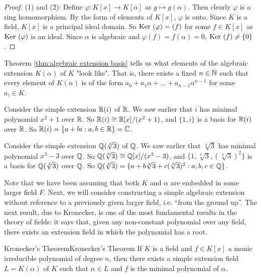 \begin{proof}
    (1) and (2): 
    Define $\varphi: K[x]\rightarrow K[\alpha]$ as $g\mapsto g(\alpha)$. 
    Then clearly $\varphi$ is a ring homomorphism. By the form of elements of $K[x]$, $\varphi$ is onto. 
    Since $K$ is a field, $K[x]$ is a principal ideal domain.
    So $\text{Ker }(\varphi)=(f)$ for some $f\in K[x]$ as $\text{Ker }(\varphi)$ is an ideal. 
    Since $\alpha$ is algebraic and $\varphi(f)=f(\alpha)=0$, $\text{Ker }(f)\neq \{0\}$.
\end{proof}



\begin{remark}
    Theorem \ref{thm:algebraic extension basis} tells us what elements of the algebraic extension $K(\alpha)$ of $K$
"look like". That is, there exists a fixed $n\in\mathbb{N}$ such that every element of $K(\alpha)$ is of the form $a_0+a_1\alpha+...+a_{n-1}\alpha^{n-1}$
for some $a_i\in K$.
\end{remark}

\begin{example}{}{}
    Consider the simple extension $\mathbb{R}(i)$ of $\mathbb{R}$. We saw earlier that $i$ has minimal polynomial $x^2+1$
    over $\mathbb{R}$. So $\mathbb{R}(i)\cong \mathbb{R}[x]/(x^2+1)$, and $\{1,i\}$ is a basis for $\mathbb{R}(i)$ over $\mathbb{R}$.
    So $\mathbb{R}(i)=\{a+bi:a,b\in\mathbb{R}\}=\mathbb{C}$.
\end{example}

\begin{example}{}{}
    Consider the simple extension $\mathbb{Q}(\sqrt[3]{3})$ of $\mathbb{Q}$. 
    We saw earlier that $\sqrt[3]{3}$ has minimal polynomial $x^3-3$ over $\mathbb{Q}$.
    So $\mathbb{Q}(\sqrt[3]{3})\cong \mathbb{Q}[x]/(x^3-3)$, and $\{1,\sqrt[3]{3},(\sqrt[3]{3})^2\}$ is a basis for $\mathbb{Q}(\sqrt[3]{3})$ over $\mathbb{Q}$.
    So $\mathbb{Q}(\sqrt[3]{3})=\{a+b\sqrt[3]{3}+c(\sqrt[3]{3})^2:a,b,c\in\mathbb{Q}\}$.
\end{example}

Note that we have been assuming that both $K$ and $\alpha$ are embedded in some larger field $F$. Next,
we will consider constructing a simple algebraic extension without reference to a previously given
larger field, i.e. “from the ground up”.
The next result, due to Kronecker, is one of the most fundamental results in the theory of fields:
it says that, given any non-constant polynomial over any field, there exists an extension field in
which the polynomial has a root.


\begin{theorem}{Kronecker's Theorem}{Kronecker's Theorem}
    If $K$ is a field and $f\in K[x]$ a monic irreducible polynomial of degree $n$, 
    then there exists a simple extension field $L=K(\alpha)$ of $K$ such that $\alpha\in L$ and $f$ is the minimal polynomial of $\alpha$. 
\end{theorem}



